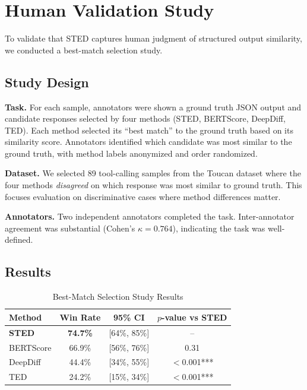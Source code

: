 \documentclass{article}
\begin{document}
\section{Human Validation Study}
\label{sec:human-validation}

To validate that STED captures human judgment of structured output similarity, we conducted a best-match selection study.

\subsection{Study Design}

\textbf{Task.} For each sample, annotators were shown a ground truth JSON output and candidate responses selected by four methods (STED, BERTScore, DeepDiff, TED). Each method selected its ``best match'' to the ground truth based on its similarity score. Annotators identified which candidate was most similar to the ground truth, with method labels anonymized and order randomized.

\textbf{Dataset.} We selected 89 tool-calling samples from the Toucan dataset where the four methods \emph{disagreed} on which response was most similar to ground truth. This focuses evaluation on discriminative cases where method differences matter.

\textbf{Annotators.} Two independent annotators completed the task. Inter-annotator agreement was substantial (Cohen's $\kappa = 0.764$), indicating the task was well-defined.

\subsection{Results}

\begin{table}[h]
\centering
\caption{Best-Match Selection Study Results}
\label{tab:human-validation}
\begin{tabular}{lccc}
\toprule
Method & Win Rate & 95\% CI & $p$-value vs STED \\
\midrule
\textbf{STED} & \textbf{74.7\%} & [64\%, 85\%] & -- \\
BERTScore & 66.9\% & [56\%, 76\%] & 0.31 \\
DeepDiff & 44.4\% & [34\%, 55\%] & $<$0.001*** \\
TED & 24.2\% & [15\%, 34\%] & $<$0.001*** \\
\bottomrule
\end{tabular}
\end{table}
\end{document}
